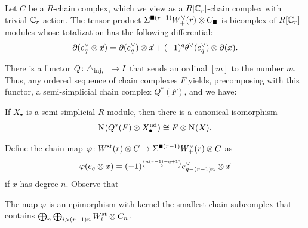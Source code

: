 \begin{example}\label{ex:311}
	Let $C$ be a $R$-chain complex, which we view as a $R[\Cyc_r]$-chain complex with trivial $\Cyc_r$ action.  The tensor product $\susp{\bs(r-1)}\Wdualaug{r} \ot C_\bs$ is bicomplex of $R[\Cyc_r]$-modules whose totalization has the following differential:
	\[
	\partial(e^\dd_{q} \ot \vec{x}) = \partial (e^\dd_{q}) \ot \vec{x} + (-1)^q \theta^\dd(e^\dd_{q}) \ot \partial (\vec{x}).
	\]
\end{example}
There is a functor $Q\colon \asimplexinj\to I$ that sends an ordinal $[m]$ to the number $m$. Thus, any ordered sequence of chain complexes $F$ yields, precomposing with this functor, a semi-simplicial chain complex $Q^*(F)$, and we have:
\begin{lemma} \label{lemma:adj}
	If $X_\bullet$ is a semi-simplicial $R$-module, then there is a canonical isomorphism
\begin{equation}\label{eq:adj}
	\chains(Q^*(F)\ot X_\bullet^{\nd})\cong F\ot \chains(X). 
\end{equation}
\end{lemma}


Define the chain map $\varphi \colon \Wst(r)\ot \ucadenas \to \susp{\bs(r-1)}\Wdualaug{r} \ot C$ as 
\[
\varphi(e_q \ot x) = (-1)^{\binom{n(r-1)-q+1}{2}}e_{q-(r-1)n}^\dd \ot \vec{x}
\]
if $x$ has degree $n$. Observe that
\begin{lemma} The map $\varphi$ is an epimorphism with kernel the smallest chain subcomplex that contains $\bigoplus_n\bigoplus_{i>(r-1)n} \Wst[i] \ot \ucadenas[n]$.
\end{lemma}


